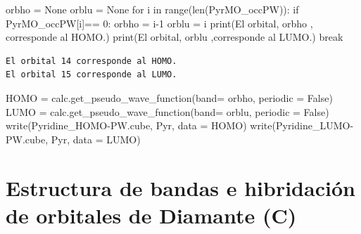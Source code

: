 \documentclass[
  letterpaper,
  DIV=11,
  numbers=noendperiod]{scrreprt}
\newenvironment{Shaded}{\begin{snugshade}}{\end{snugshade}}
\newcommand{\BuiltInTok}[1]{\textcolor[rgb]{0.00,0.23,0.31}{#1}}
\newcommand{\ControlFlowTok}[1]{\textcolor[rgb]{0.00,0.23,0.31}{#1}}
\newcommand{\DecValTok}[1]{\textcolor[rgb]{0.68,0.00,0.00}{#1}}
\newcommand{\KeywordTok}[1]{\textcolor[rgb]{0.00,0.23,0.31}{#1}}
\newcommand{\NormalTok}[1]{\textcolor[rgb]{0.00,0.23,0.31}{#1}}
\newcommand{\OperatorTok}[1]{\textcolor[rgb]{0.37,0.37,0.37}{#1}}
\newcommand{\StringTok}[1]{\textcolor[rgb]{0.13,0.47,0.30}{#1}}
\newcommand{\VariableTok}[1]{\textcolor[rgb]{0.07,0.07,0.07}{#1}}
\begin{document}
\begin{Shaded}
\begin{Highlighting}[]
\NormalTok{orbho }\OperatorTok{=} \VariableTok{None}
\NormalTok{orblu }\OperatorTok{=} \VariableTok{None}
\ControlFlowTok{for}\NormalTok{ i }\KeywordTok{in} \BuiltInTok{range}\NormalTok{(}\BuiltInTok{len}\NormalTok{(PyrMO\_occPW)):}
  \ControlFlowTok{if}\NormalTok{ PyrMO\_occPW[i]}\OperatorTok{==} \DecValTok{0}\NormalTok{:}
\NormalTok{    orbho }\OperatorTok{=}\NormalTok{ i}\OperatorTok{{-}}\DecValTok{1}
\NormalTok{    orblu }\OperatorTok{=}\NormalTok{ i}
    \BuiltInTok{print}\NormalTok{(}\StringTok{\textquotesingle{}El orbital\textquotesingle{}}\NormalTok{, orbho , }\StringTok{\textquotesingle{}corresponde al HOMO.\textquotesingle{}}\NormalTok{)}
    \BuiltInTok{print}\NormalTok{(}\StringTok{\textquotesingle{}El orbital\textquotesingle{}}\NormalTok{, orblu ,}\StringTok{\textquotesingle{}corresponde al LUMO.\textquotesingle{}}\NormalTok{)}
    \ControlFlowTok{break}
\end{Highlighting}
\end{Shaded}

\begin{verbatim}
El orbital 14 corresponde al HOMO.
El orbital 15 corresponde al LUMO.
\end{verbatim}

\begin{Shaded}
\begin{Highlighting}[]
\NormalTok{HOMO }\OperatorTok{=}\NormalTok{ calc.get\_pseudo\_wave\_function(band}\OperatorTok{=}\NormalTok{ orbho, periodic }\OperatorTok{=} \VariableTok{False}\NormalTok{)}
\NormalTok{LUMO }\OperatorTok{=}\NormalTok{ calc.get\_pseudo\_wave\_function(band}\OperatorTok{=}\NormalTok{ orblu, periodic }\OperatorTok{=} \VariableTok{False}\NormalTok{)}
\NormalTok{write(}\StringTok{\textquotesingle{}Pyridine\_HOMO{-}PW.cube\textquotesingle{}}\NormalTok{, Pyr, data }\OperatorTok{=}\NormalTok{ HOMO)}
\NormalTok{write(}\StringTok{\textquotesingle{}Pyridine\_LUMO{-}PW.cube\textquotesingle{}}\NormalTok{, Pyr, data }\OperatorTok{=}\NormalTok{ LUMO)}
\end{Highlighting}
\end{Shaded}

\hypertarget{estructura-de-bandas-e-hibridaciuxf3n-de-orbitales-de-diamante-c}{%
\chapter{Estructura de bandas e hibridación de orbitales de Diamante
(C)}\label{estructura-de-bandas-e-hibridaciuxf3n-de-orbitales-de-diamante-c}}
\end{document}
